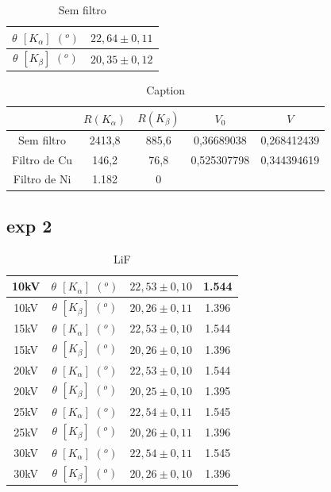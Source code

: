\documentclass[article,12pt,openright,oneside,a4paper,brazil]{abntex2}
\begin{document}
\begin{table}[H]
    \centering
    \begin{tabular}{|c|c|}
        \hline
        $\theta$ $[K_\alpha]$ $(^o)$ & $22,64\pm0,11$ \\ \hline
        $\theta$ $[K_\beta]$ $(^o)$ & $20,35\pm0,12$ \\ \hline
    \end{tabular}
    \caption{Sem filtro}
    \label{tab:my_label6}
\end{table}

\begin{table}[H]
    \centering
    \begin{tabular}{|c|c|c|c|c|}
    \hline
         & $R(K_\alpha)$ & $R(K_\beta)$ & $V_0$ & $V$ \\ \hline
        Sem filtro & 2413,8 & 885,6 & 0,36689038 & 0,268412439 \\ \hline
        Filtro de Cu & 146,2 & 76,8 & 0,525307798 & 0,344394619 \\ \hline
        Filtro de Ni & 1.182 & 0 &  &  \\ \hline 
    \end{tabular}
    \caption{Caption}
    \label{tab:my_label}
\end{table}

\subsection{exp 2}

\begin{table}[H]
    \centering
    \begin{tabular}{|c|c|c|c|}
        \hline
        10kV & $\theta$ $[K_\alpha]$ $(^o)$ & $22,53\pm0,10$ & 1.544\\ \hline
        10kV & $\theta$ $[K_\beta]$ $(^o)$ & $20,26\pm0,11$ & 1.396\\ \hline
        15kV & $\theta$ $[K_\alpha]$ $(^o)$ & $22,53\pm0,10$ & 1.544\\ \hline
        15kV & $\theta$ $[K_\beta]$ $(^o)$ & $20,26\pm0,10$ & 1.396\\ \hline
        20kV & $\theta$ $[K_\alpha]$ $(^o)$ & $22,53\pm0,10$ & 1.544\\ \hline
        20kV & $\theta$ $[K_\beta]$ $(^o)$ & $20,25\pm0,10$ & 1.395\\ \hline
        25kV & $\theta$ $[K_\alpha]$ $(^o)$ & $22,54\pm0,11$ & 1.545\\ \hline
        25kV & $\theta$ $[K_\beta]$ $(^o)$ & $20,26\pm0,11$ & 1.396\\ \hline
        30kV & $\theta$ $[K_\alpha]$ $(^o)$ & $22,54\pm0,11$ & 1.545\\ \hline
        30kV & $\theta$ $[K_\beta]$ $(^o)$ & $20,26\pm0,10$ & 1.396\\ \hline
    \end{tabular}
    \caption{LiF}
    \label{tab:my_label7}
\end{table}
\end{document}
